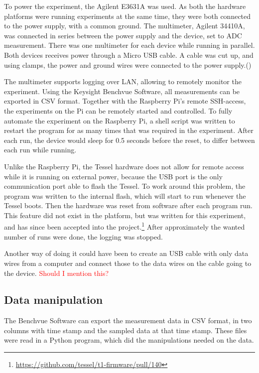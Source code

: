 To power the experiment, the Agilent E3631A was used. 
As both the hardware platforms were running experiments at the same time, they were both connected to the power supply, with a common ground. 
The multimeter, Agilent 34410A, was connected in series between the power supply and the device, set to ADC measurement. 
There was one multimeter for each device while running in parallel.
Both devices receives power through a Micro USB cable.
A cable was cut up, and using clamps, the power and ground wires were connected to the power supply.(\cite{usbmicro})

The multimeter supports logging over LAN, allowing to remotely monitor the experiment.
Using the Keysight Benchvue Software, all measurements can be exported in CSV format.
Together with the Raspberry Pi's remote SSH-access, the experiments on the Pi can be remotely started and controlled.
To fully automate the experiment on the Raspberry Pi, a shell script was written to restart the program for as many times that was required in the experiment.
After each run, the device would sleep for 0.5 seconds before the reset, to differ between each run while running.

Unlike the Raspberry Pi, the Tessel hardware does not allow for remote access while it is running on external power, because the USB port is the only communication port able to flash the Tessel.
To work around this problem, the program was written to the internal flash, which will start to run whenever the Tessel boots.
Then the hardware was reset from software after each program run.
This feature did not exist in the platform, but was written for this experiment, and has since been accepted into the project.\footnote{\url{https://github.com/tessel/t1-firmware/pull/140}}
After approximately the wanted number of runs were done, the logging was stopped.

Another way of doing it could have been to create an USB cable with only data wires from a computer and connect those to the data wires on the cable going to the device. \textcolor{red}{Should I mention this?}


\subsection{Data manipulation}
The Benchvue Software can export the measurement data in CSV format, in two columns with time stamp and the sampled data at that time stamp.
These files were read in a Python program, which did the manipulations needed on the data.


